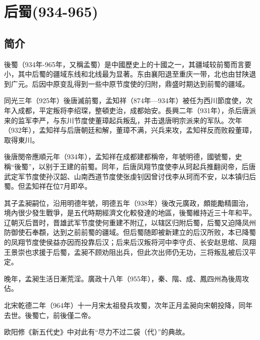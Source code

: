 

\section{后蜀\tiny(934-965)}

\subsection{简介}

後蜀（934年-965年，又稱孟蜀）是中國歷史上的十國之一，其疆域较前蜀而言要小，其中后蜀的疆域东线和北线最为显著。东由襄阳退至重庆一带，北也由甘陕退到广元。后因中原变乱得到一些中原节度使的归附，鼎盛时期达到前蜀的疆域。

同光三年（925年）後唐滅前蜀，孟知祥（874年—934年）被任为西川節度使，次年入成都，平定叛将李绍琛，整頓吏治，成都始安。長興二年（931年），杀后唐派来的监军李严，与东川节度使董璋起兵叛乱，并击退唐明宗派来的军队。次年（932年），孟知祥与后唐朝廷和解，董璋不满，兴兵来攻，孟知祥反而败殺董璋，取得東川。

後唐閔帝應順元年（934年），孟知祥在成都建都稱帝，年號明德，國號蜀，史稱“後蜀”，以别于王建的前蜀。同年，后唐凤翔节度使李从珂起兵推翻闵帝，后唐武定军节度使孙汉韶、山南西道节度使张虔钊因曾讨伐李从珂而不安，以本镇归后蜀。但孟知祥在位7月即卒。

其子孟昶嗣位，沿用明德年號，明德五年（938年）後改元廣政，頗能勵精圖治，境內很少發生戰爭，是五代時期經濟文化較發達的地區，後蜀維持近三十年和平。辽朝灭后晋时，晋雄武军节度使何重建不附辽，以辖区归附后蜀，后蜀又迫降凤州防御使石奉頵，达到之前前蜀的疆域。但后蜀随即被新建立的后汉所败，本已降蜀的凤翔节度使侯益亦因而投靠后汉；后来后汉叛将河中李守贞、长安赵思绾、凤翔王景崇也求援于后蜀，孟昶不顾劝阻出兵，但此次出师仍无功，三将叛乱被后汉平定。

晚年，孟昶生活日漸荒淫。廣政十八年（955年），秦、階、成、鳳四州為後周攻佔。

北宋乾德二年（964年）十一月宋太祖發兵攻蜀，次年正月孟昶向宋朝投降，同年去世。後蜀亡，前後僅二帝。

欧阳修《新五代史》中对此有“尽力不过二袋（代）”的典故。






